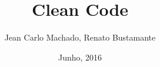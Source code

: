 \usepackage{graphicx}
\usepackage[utf8]{inputenc}
\title{Clean Code}
\author{Jean Carlo Machado, Renato Bustamante}
\date{Junho, 2016}
\usepackage[overlay,absolute]{textpos}
\usepackage{ragged2e}
\justifying
{}
\geometry{paperwidth=140mm,paperheight=105mm}

